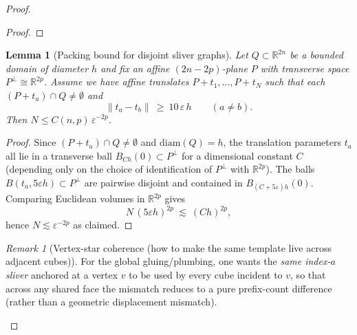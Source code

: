 \documentclass[11pt]{article}
\numberwithin{equation}{section}  %
\theoremstyle{plain}
\newtheorem{lemma}[theorem]{Lemma}
\theoremstyle{definition}
\theoremstyle{remark}
\newtheorem{remark}[theorem]{Remark}
\newcommand{\R}{\mathbb{R}}
\begin{document}
\begin{proof}
\begin{proof}
\end{proof}












\begin{lemma}[Packing bound for disjoint sliver graphs]\label{lem:sliver-packing}
Let $Q\subset\R^{2n}$ be a bounded domain of diameter $h$ and fix an affine $(2n-2p)$-plane $P$ with transverse space $P^\perp\cong\R^{2p}$.
Assume we have affine translates $P+t_1,\dots,P+t_N$ such that each $(P+t_a)\cap Q\neq\emptyset$ and
\[
\|t_a-t_b\|\ \ge\ 10\,\varepsilon\,h
\qquad (a\neq b).
\]
Then $N\le C(n,p)\,\varepsilon^{-2p}$.
\end{lemma}

\begin{proof}
Since $(P+t_a)\cap Q\neq\emptyset$ and $\mathrm{diam}(Q)=h$, the translation parameters $t_a$ all lie in a transverse ball $B_{Ch}(0)\subset P^\perp$
for a dimensional constant $C$ (depending only on the choice of identification of $P^\perp$ with $\R^{2p}$).
The balls $B(t_a,5\varepsilon h)\subset P^\perp$ are pairwise disjoint and contained in $B_{(C+5\varepsilon)h}(0)$.
Comparing Euclidean volumes in $\R^{2p}$ gives
\[
N\,(5\varepsilon h)^{2p}\ \lesssim\ (Ch)^{2p},
\]
hence $N\lesssim \varepsilon^{-2p}$ as claimed.
\end{proof}



















\begin{remark}[Vertex-star coherence (how to make the same template live across adjacent cubes)]\label{rem:vertex-star-coherence}
For the global gluing/plumbing, one wants the \emph{same index-$a$ sliver} anchored at a vertex $v$ to be used by every cube incident to $v$,
so that across any shared face the mismatch reduces to a pure prefix-count difference (rather than a geometric displacement mismatch).


\end{remark}
\end{proof}
\end{document}
